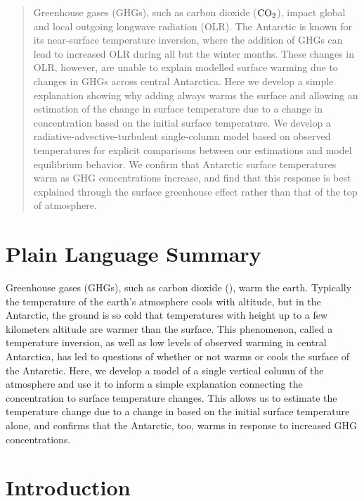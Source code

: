 \documentclass[draft]{agujournal2019}
\begin{document}
\begin{abstract}
Greenhouse gases (GHGs), such as carbon dioxide ($\ce{CO_2}$), impact global and local outgoing longwave radiation (OLR). The Antarctic is known for its near-surface temperature inversion, where the addition of GHGs can lead to increased OLR during all but the winter months. These changes in OLR, however, are unable to explain modelled surface warming due to changes in GHGs across central Antarctica. Here we develop a simple explanation showing why adding  always warms the surface and allowing an estimation of the change in surface temperature due to a change in  concentration based on the initial surface temperature. We develop a radiative-advective-turbulent single-column model based on observed temperatures for explicit comparisons between our estimations and model equilibrium behavior. We confirm that Antarctic surface temperatures warm as GHG concentrations increase, and find that this response is best explained through the surface greenhouse effect rather than that of the top of atmosphere.
\end{abstract}

\section*{Plain Language Summary}
Greenhouse gases (GHGs), such as carbon dioxide (), warm the earth. Typically the temperature of the earth's atmosphere cools with altitude, but in the Antarctic, the ground is so cold that temperatures with height up to a few kilometers altitude are warmer than the surface. This phenomenon, called a temperature inversion, as well as low levels of observed warming in central Antarctica, has led to questions of whether or not  warms or cools the surface of the Antarctic. Here, we develop a model of a single vertical column of the atmosphere and use it to inform a simple explanation connecting the  concentration to surface temperature changes. This allows us to estimate the temperature change due to a change in  based on the initial surface temperature alone, and confirms that the Antarctic, too, warms in response to increased GHG concentrations.


%
%

\section{Introduction}
%
\end{document}
